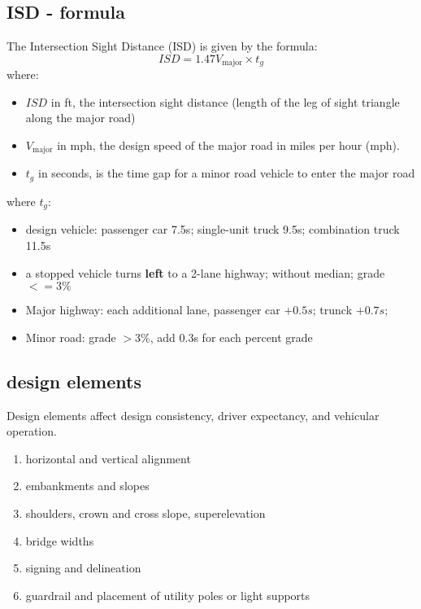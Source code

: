 \documentclass{article}
\begin{document}
  \subsection{ISD - formula}
  The Intersection Sight Distance (ISD) is given by the formula:
  \begin{equation}
      ISD = 1.47 V_{\text{major}} \times t_g
  \end{equation}
  where:
  \begin{itemize}
      \item $ISD$ in ft, the intersection sight distance (length of the leg of sight triangle along the major road)
      \item $V_{\text{major}}$ in mph, the design speed of the major road in miles per hour (mph).
      \item $t_g$ in seconds, is the time gap for a minor road vehicle to enter the major road
  \end{itemize}
  where $t_g$:
  \begin{itemize}
      \item design vehicle: passenger car 7.5s; single-unit truck 9.5s; combination truck 11.5s
      \item a stopped vehicle turns \textbf{left} to a 2-lane highway; without median; grade $<= 3\%$
      \item Major highway: each additional lane, passenger car $+ 0.5s$; trunck $+ 0.7s$;
      \item Minor road: grade $> 3\%$, add 0.3s for each percent grade
  \end{itemize}






  \subsection{design elements}
  Design elements affect design consistency, driver expectancy, and vehicular operation.
  \begin{enumerate}
    \item horizontal and vertical alignment
    \item embankments and slopes
    \item shoulders, crown and cross slope, superelevation
    \item bridge widths
    \item signing and delineation
    \item guardrail and placement of utility poles or light supports
  \end{enumerate}
\end{document}
